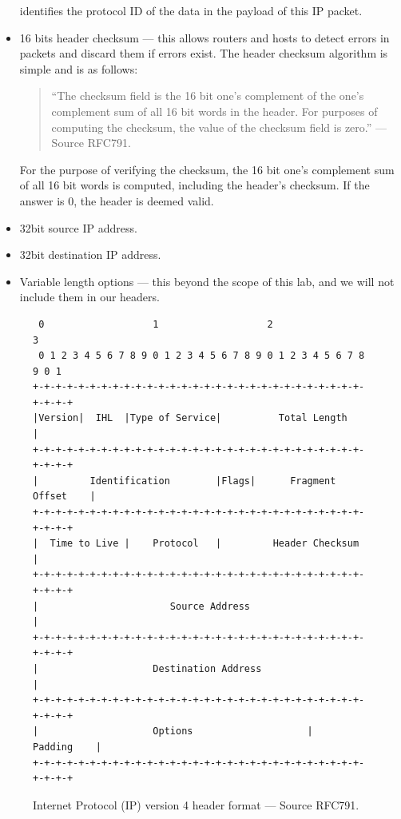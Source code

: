 \documentclass[pdftex,12pt,a4paper]{article}
\begin{document}
\begin{itemize}
                        identifies the protocol ID of the data in the payload
                        of this IP packet.
                    \item 16 bits header checksum --- this allows routers and
                        hosts to detect errors in packets and discard them if
                        errors exist. The header checksum algorithm is simple
                        and is as follows:
                        \begin{quote}
                            ``The checksum field is the 16 bit one's complement of the
                            one's complement sum of all 16 bit words in the header.
                            For purposes of computing the checksum, the value of the
                            checksum field is zero.'' --- Source RFC791.
                        \end{quote}

                        For the purpose of verifying the checksum, the 16 bit
                        one's complement sum of all 16 bit words is computed,
                        including the header's checksum. If the answer is 0,
                        the header is deemed valid.

                    \item 32bit source IP address.
                    \item 32bit destination IP address.
                    \item Variable length options --- this beyond the scope of
                        this lab, and we will not include them in our headers.
                \end{itemize}

                \begin{figure}[tbh]
                    \centering
                    \begin{verbatim} 0                   1                   2                   3
 0 1 2 3 4 5 6 7 8 9 0 1 2 3 4 5 6 7 8 9 0 1 2 3 4 5 6 7 8 9 0 1
+-+-+-+-+-+-+-+-+-+-+-+-+-+-+-+-+-+-+-+-+-+-+-+-+-+-+-+-+-+-+-+-+
|Version|  IHL  |Type of Service|          Total Length         |
+-+-+-+-+-+-+-+-+-+-+-+-+-+-+-+-+-+-+-+-+-+-+-+-+-+-+-+-+-+-+-+-+
|         Identification        |Flags|      Fragment Offset    |
+-+-+-+-+-+-+-+-+-+-+-+-+-+-+-+-+-+-+-+-+-+-+-+-+-+-+-+-+-+-+-+-+
|  Time to Live |    Protocol   |         Header Checksum       |
+-+-+-+-+-+-+-+-+-+-+-+-+-+-+-+-+-+-+-+-+-+-+-+-+-+-+-+-+-+-+-+-+
|                       Source Address                          |
+-+-+-+-+-+-+-+-+-+-+-+-+-+-+-+-+-+-+-+-+-+-+-+-+-+-+-+-+-+-+-+-+
|                    Destination Address                        |
+-+-+-+-+-+-+-+-+-+-+-+-+-+-+-+-+-+-+-+-+-+-+-+-+-+-+-+-+-+-+-+-+
|                    Options                    |    Padding    |
+-+-+-+-+-+-+-+-+-+-+-+-+-+-+-+-+-+-+-+-+-+-+-+-+-+-+-+-+-+-+-+-+\end{verbatim}
                    \caption{Internet Protocol (IP) version 4 header format --- Source RFC791.}
                    \label{fig:ipv4}
                \end{figure}
\end{document}
